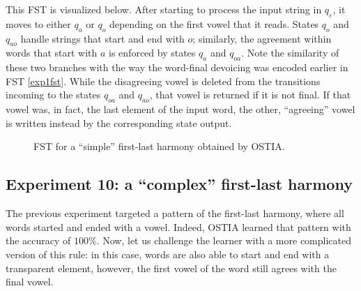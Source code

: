 This FST is visualized below.
After starting to process the input string in $q_\varepsilon$, it moves to either $q_a$ or $q_o$ depending on the first vowel that it reads.
States $q_o$ and $q_{ao}$ handle strings that start and end with $o$; similarly, the agreement within words that start with $a$ is enforced by states $q_a$ and $q_{oa}$.
Note the similarity of these two branches with the way the word-final devoicing was encoded earlier in FST \ref{exp1fst}.
While the disagreeing vowel is deleted from the transitions incoming to the states $q_{oa}$ and $q_{ao}$, that vowel is returned if it is not final.
If that vowel was, in fact, the last element of the input word, the other, ``agreeing'' vowel is written instead by the corresponding state output.



\begin{figure}[h!] 
\centering
{}
\caption{FST for a ``simple'' first-last harmony obtained by OSTIA.}
\label{exp9fst}
\end{figure}



\subsection{Experiment 10: a ``complex'' first-last harmony}

The previous experiment targeted a pattern of the first-last harmony, where all words started and ended with a vowel.
Indeed, OSTIA learned that pattern with the accuracy of $100$\%.
Now, let us challenge the learner with a more complicated version of this rule: in this case, words are also able to start and end with a transparent element, however, the first vowel of the word still agrees with the final vowel.


